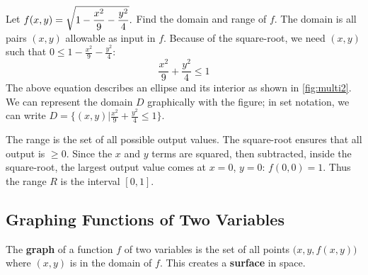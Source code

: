 \begin{example}\label{ex_multi2}%
Let $\displaystyle f(x,y) = \sqrt{1-\frac{x^2}9-\frac{y^2}4}.$ Find the domain and range of $f$.
\solution
The domain is all pairs $(x,y)$ allowable as input in $f$. Because of the square-root, we need $(x,y)$ such that $0\leq1-\frac{x^2}9-\frac{y^2}4$:
\[\frac{x^2}9+\frac{y^2}4 \leq 1\]
The above equation describes an ellipse and its interior as shown in \autoref{fig:multi2}. We can represent the domain $D$ graphically with the figure; in set notation, we can write $D = \{(x,y)\vert\frac{x^2}9+\frac{y^2}4 \leq 1\}$.

The range is the set of all possible output values. The square-root ensures that all output is $\geq 0$. Since the $x$ and $y$ terms are squared, then subtracted, inside the square-root, the largest output value comes at $x=0$, $y=0$: $f(0,0) = 1$. Thus the range $R$ is the interval $[0,1]$.
\end{example}

\subsection{Graphing Functions of Two Variables}

The \textbf{graph} of a function $f$ of two variables is the set of all points $\bigl(x,y,f(x,y)\bigr)$ where $(x,y)$ is in the domain of $f$. This creates a \textbf{surface} in space.


